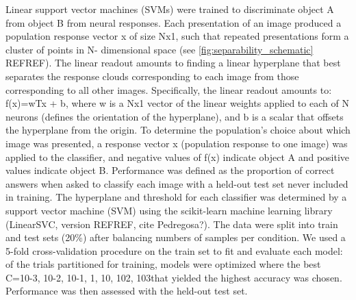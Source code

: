 Linear support vector machines (SVMs) were trained to discriminate object A from object B from neural responses. Each presentation of an image produced a population response vector x of size Nx1, such that repeated presentations form a cluster of points in N- dimensional space (see \ref{fig:separability_schematic} REFREF). The linear readout amounts to finding a linear hyperplane that best separates the response clouds corresponding to each image from those corresponding to all other images. Specifically, the linear readout amounts to: f(x)=wTx + b, where w is a Nx1 vector of the linear weights applied to each of N neurons (defines the orientation of the hyperplane), and b is a scalar that offsets the hyperplane from the origin. To determine the population’s choice about which image was presented, a response vector x (population response to one image) was applied to the classifier, and negative values of f(x) indicate object A and positive values indicate object B. Performance was defined as the proportion of correct answers when asked to classify each image with a held-out test set never included in training. 
The hyperplane and threshold for each classifier was determined by a support vector machine (SVM) using the scikit-learn machine learning library (LinearSVC, version REFREF, cite Pedregosa?). The data were split into train and test sets (20\%) after balancing numbers of samples per condition. We used a 5-fold cross-validation procedure on the train set to fit and evaluate each model:  of the trials partitioned for training, models were optimized where the best C={10-3, 10-2, 10-1, 1, 10, 102, 103}that yielded the highest accuracy was chosen. Performance was then assessed with the held-out test set. 

